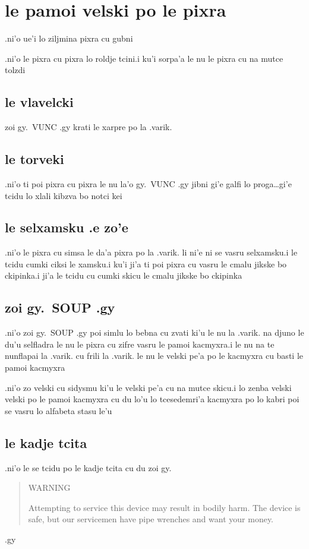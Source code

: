 \documentclass{report}
\begin{document}
\section{le pamoi velski po le pixra}
.ni'o ue'i lo ziljmina pixra cu gubni

.ni'o le pixra cu pixra lo roldje tcini\@  .i ku'i sorpa'a le nu le pixra cu na mutce tolzdi

\subsection{le vlavelcki}
zoi gy.\ VUNC .gy krati le xarpre po la .varik.
\subsection{le torveki}
.ni'o ti poi pixra cu pixra le nu la'o gy.\ VUNC .gy jibni gi'e galfi lo proga\ldots gi'e tcidu lo xlali kibzva bo notci kei

\subsection{le selxamsku .e zo'e}
.ni'o le pixra cu simsa le da'a pixra po la .varik. li ni'e ni se vasru selxamsku\@  .i le tcidu cumki ciksi le xamsku\@  .i ku'i ji'a ti poi pixra cu vasru le cmalu jikske bo ckipinka\@  .i ji'a le tcidu cu cumki skicu le cmalu jikske bo ckipinka

\subsection{zoi gy.\ SOUP .gy}
.ni'o zoi gy.\ SOUP .gy poi simlu lo bebna cu zvati ki'u le nu la .varik. na djuno le du'u selfladra le nu le pixra cu zifre vasru le pamoi kacmyxra\@  .i le nu na te nunflapai la .varik. cu frili la .varik. le nu le velski pe'a po le kacmyxra cu basti le pamoi kacmyxra

.ni'o zo velski cu sidysmu ki'u le velski pe'a cu na mutce skicu\@  .i lo zenba velski velski po le pamoi kacmyxra cu du lo'u lo tcesedemri'a kacmyxra po lo kabri poi se vasru lo alfabeta stasu le'u

\subsection{le kadje tcita}
.ni'o le se tcidu po le kadje tcita cu du zoi gy.
\begin{quote}
	WARNING

	Attempting to service this device may result in bodily harm.  The device is safe, but our servicemen have pipe wrenches and want your money.
\end{quote}
.gy
\end{document}
